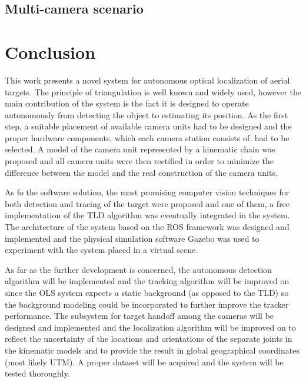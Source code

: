 \section{Multi-camera scenario} \label{txt:multi-camera_scenario}

\vata[7]

\chapter{Conclusion} \label{txt:conclusion}



This work presents a novel system for autonomous optical localization of aerial targets. The principle of triangulation is well known and widely used, however the main contribution of the system is the fact it is designed to operate autonomously from detecting the object to estimating its position. As the first step, a suitable placement of available camera units had to be designed and the proper hardware components, which each camera station consists of, had to be selected. A model of the camera unit represented by a kinematic chain was proposed and all camera units were then rectified in order to minimize the difference between the model and the real construction of the camera units.

As fo the software solution, the most promising computer vision techniques for both detection and tracing of the target were proposed and one of them, a free implementation of the TLD algorithm was eventually integrated in the system. The architecture of the system based on the ROS framework was designed and implemented and the physical simulation software Gazebo was used to experiment with the system placed in a virtual scene.

As far as the further development is concerned, the autonomous detection algorithm will be implemented and the tracking algorithm will be improved on since the OLS system expects a static background (as opposed to the TLD) so the background modeling could be incorporated to further improve the tracker performance. The subsystem for target handoff among the cameras will be designed and implemented and the localization algorithm will be improved on to reflect the uncertainty of the locations and orientations of the separate joints in the kinematic models and to provide the result in global geographical coordinates (most likely UTM). A proper dataset will be acquired and the system will be tested thoroughly.

\vata[5]